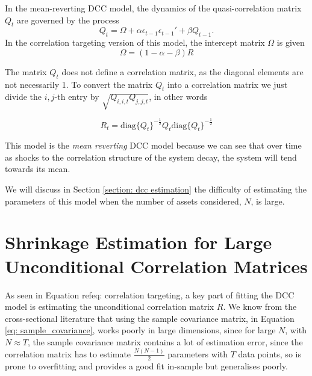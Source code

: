 \documentclass{article} %
\numberwithin{equation}{section} %
\numberwithin{figure}{section} %
\numberwithin{table}{section} %
\begin{document}
In the mean-reverting DCC model, the dynamics of the quasi-correlation matrix $Q_t$ are governed by the process
\begin{equation}
  Q_t = \Omega + \alpha \epsilon_{t-1}\epsilon_{t-1}' + \beta Q_{t-1}.
\end{equation}
In the correlation targeting version of this model, the intercept matrix $\Omega$ is given
\begin{equation}\label{eq: correlation targeting}
  \Omega = (1 - \alpha - \beta)R
\end{equation}

The matrix $Q_t$ does not define a correlation matrix, as the diagonal elements are not necessarily 1. To convert the matrix $Q_t$ into a correlation matrix we just divide the $i,j$-th entry by $\sqrt{Q_{i,i,t}Q_{j,j,t}}$, in other words

\begin{equation}
  R_t = \text{diag}\{Q_t\}^{-\frac{1}{2}} Q_t \text{diag}\{Q_t\}^{-\frac{1}{2}}
\end{equation}

This model is the \textit{mean reverting} DCC model because we can see that over time as shocks to the correlation structure of the system decay, the system will tend towards its mean.

We will discuss in Section \ref{section: dcc estimation} the difficulty of estimating the parameters of this model when the number of assets considered, $N$, is large.


\section{Shrinkage Estimation for Large Unconditional Correlation Matrices}\label{section: shrinkage}

As seen in Equation ref{eq: correlation targeting}, a key part of fitting the DCC model is estimating the unconditional correlation matrix $R$. We know from the cross-sectional literature that using the sample covariance matrix, in Equation \ref{eq: sample_covariance}, works poorly in large dimensions, since for large $N$, with $N \approx T$, the sample covariance matrix contains a lot of estimation error, since the correlation matrix has to estimate $\frac{N(N-1)}{2}$ parameters with $T$ data points, so is prone to overfitting and provides a good fit in-sample but generalises poorly.
\end{document}
